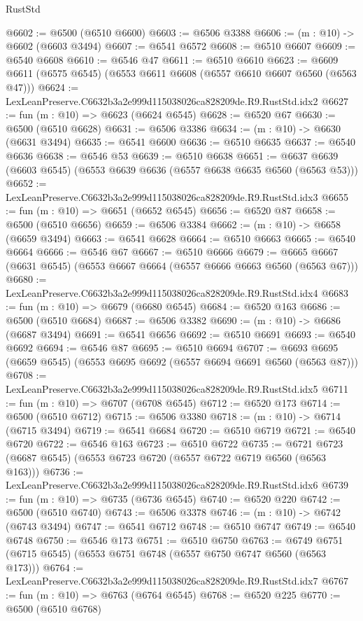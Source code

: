 \begin{lexlean}{RustStd}
\begin{coremodule}
@6602 := @6500 (@6510 @6600)
@6603 := @6506 @3388
@6606 := (m : @10) -> @6602 (@6603 @3494)
@6607 := @6541 @6572
@6608 := @6510 @6607
@6609 := @6540 @6608
@6610 := @6546 @47
@6611 := @6510 @6610
@6623 := @6609 @6611 (@6575 @6545) (@6553 @6611 @6608 (@6557 @6610 @6607 @6560 (@6563 @47)))
@6624 := LexLeanPreserve.C6632b3a2e999d115038026ca828209de.R9.RustStd.idx2
@6627 := fun (m : @10) => @6623 (@6624 @6545)
@6628 := @6520 @67
@6630 := @6500 (@6510 @6628)
@6631 := @6506 @3386
@6634 := (m : @10) -> @6630 (@6631 @3494)
@6635 := @6541 @6600
@6636 := @6510 @6635
@6637 := @6540 @6636
@6638 := @6546 @53
@6639 := @6510 @6638
@6651 := @6637 @6639 (@6603 @6545) (@6553 @6639 @6636 (@6557 @6638 @6635 @6560 (@6563 @53)))
@6652 := LexLeanPreserve.C6632b3a2e999d115038026ca828209de.R9.RustStd.idx3
@6655 := fun (m : @10) => @6651 (@6652 @6545)
@6656 := @6520 @87
@6658 := @6500 (@6510 @6656)
@6659 := @6506 @3384
@6662 := (m : @10) -> @6658 (@6659 @3494)
@6663 := @6541 @6628
@6664 := @6510 @6663
@6665 := @6540 @6664
@6666 := @6546 @67
@6667 := @6510 @6666
@6679 := @6665 @6667 (@6631 @6545) (@6553 @6667 @6664 (@6557 @6666 @6663 @6560 (@6563 @67)))
@6680 := LexLeanPreserve.C6632b3a2e999d115038026ca828209de.R9.RustStd.idx4
@6683 := fun (m : @10) => @6679 (@6680 @6545)
@6684 := @6520 @163
@6686 := @6500 (@6510 @6684)
@6687 := @6506 @3382
@6690 := (m : @10) -> @6686 (@6687 @3494)
@6691 := @6541 @6656
@6692 := @6510 @6691
@6693 := @6540 @6692
@6694 := @6546 @87
@6695 := @6510 @6694
@6707 := @6693 @6695 (@6659 @6545) (@6553 @6695 @6692 (@6557 @6694 @6691 @6560 (@6563 @87)))
@6708 := LexLeanPreserve.C6632b3a2e999d115038026ca828209de.R9.RustStd.idx5
@6711 := fun (m : @10) => @6707 (@6708 @6545)
@6712 := @6520 @173
@6714 := @6500 (@6510 @6712)
@6715 := @6506 @3380
@6718 := (m : @10) -> @6714 (@6715 @3494)
@6719 := @6541 @6684
@6720 := @6510 @6719
@6721 := @6540 @6720
@6722 := @6546 @163
@6723 := @6510 @6722
@6735 := @6721 @6723 (@6687 @6545) (@6553 @6723 @6720 (@6557 @6722 @6719 @6560 (@6563 @163)))
@6736 := LexLeanPreserve.C6632b3a2e999d115038026ca828209de.R9.RustStd.idx6
@6739 := fun (m : @10) => @6735 (@6736 @6545)
@6740 := @6520 @220
@6742 := @6500 (@6510 @6740)
@6743 := @6506 @3378
@6746 := (m : @10) -> @6742 (@6743 @3494)
@6747 := @6541 @6712
@6748 := @6510 @6747
@6749 := @6540 @6748
@6750 := @6546 @173
@6751 := @6510 @6750
@6763 := @6749 @6751 (@6715 @6545) (@6553 @6751 @6748 (@6557 @6750 @6747 @6560 (@6563 @173)))
@6764 := LexLeanPreserve.C6632b3a2e999d115038026ca828209de.R9.RustStd.idx7
@6767 := fun (m : @10) => @6763 (@6764 @6545)
@6768 := @6520 @225
@6770 := @6500 (@6510 @6768)

\end{coremodule}
\end{lexlean}
